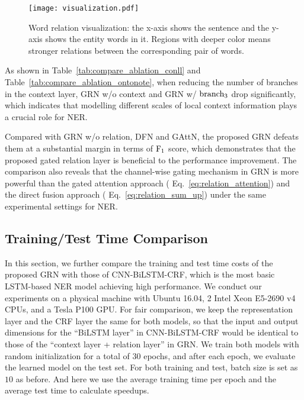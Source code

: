 \documentclass[letterpaper]{article} \usepackage{aaai19}  \usepackage{times}  \usepackage{helvet}  \usepackage{courier}  \usepackage{url}  \usepackage{graphicx}  \usepackage{amsmath}
\newcommand{\ie}{\text{i.e.,}}
\newcommand{\GAN}{GAttN}
\newcommand{\GRN}{GRN}
\begin{document}
\begin{figure}[!t]\centering
  \texttt{[image: visualization.pdf]}
  \caption{Word relation visualization: the x-axis shows the sentence and the y-axis shows the entity words in it. Regions with deeper color means stronger relations between the corresponding pair of words.}
  \label{fig:visualization}
\end{figure}

As shown in Table~\ref{tab:compare_ablation_conll} and Table~\ref{tab:compare_ablation_ontonote}, when reducing the number of branches in the context layer, \GRN{} w/o context and \GRN{} w/ $\rm branch_3$ drop significantly, which indicates that modelling different scales of local context information plays a crucial role for NER.

Compared with \GRN{} w/o relation, DFN and \GAN{}, the proposed \GRN{} defeats them at a substantial margin in terms of $\rm F_1$ score, which demonstrates that the proposed gated relation layer is beneficial to the performance improvement. The comparison also reveals that the channel-wise gating mechanism in \GRN{} is more powerful than the gated attention approach (\ie{} Eq.~\ref{eq:relation_attention}) and the direct fusion approach (\ie{} Eq.~\ref{eq:relation_sum_up}) under the same experimental settings for NER.


\subsection{Training/Test Time Comparison}


In this section, we further compare the training and test time costs of the proposed \GRN{} with those of CNN-BiLSTM-CRF, which is the most basic LSTM-based NER model achieving high performance. We conduct our experiments on a physical machine with Ubuntu 16.04, 2 Intel Xeon E5-2690 v4 CPUs, and a Tesla P100 GPU. For fair comparison, we keep the representation layer and the CRF layer the same for both models, so that the input and output dimensions for the ``BiLSTM layer'' in CNN-BiLSTM-CRF would be identical to those of the ``context layer + relation layer'' in \GRN{}. We train both models with random initialization for a total of 30 epochs, and after each epoch, we evaluate the learned model on the test set. For both training and test, batch size is set as $10$ as before. And here we use the average training time per epoch and the average test time to calculate speedups.
\end{document}
